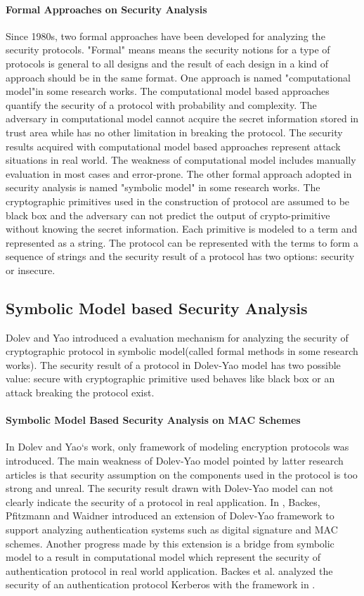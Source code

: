\documentclass{article}
\begin{document}
\paragraph{Formal Approaches on Security Analysis}
Since 1980s, two formal approaches have been developed for analyzing the security protocols. "Formal" means means the security notions for a type of protocols is general to all designs and the result of each design in a kind of approach should be in the same format. One approach is named "computational model"in some research works. The computational model based approaches quantify the security of a protocol with probability and complexity. The adversary in computational model cannot acquire the secret information stored in trust area while has no other limitation in breaking the protocol. The security results acquired with computational model based approaches represent attack situations in real world. The weakness of computational model includes manually evaluation in most cases and error-prone. 
The other formal approach adopted in security analysis is named "symbolic model" in some research works. The cryptographic primitives used in the construction of protocol are assumed to be black box and the adversary can not predict the output of crypto-primitive without knowing the secret information. Each primitive is modeled to a term and represented as a string. The protocol can be represented with the terms to form a sequence of strings and the security result of a protocol has two options: security or insecure.  
\subsection{Symbolic Model based Security Analysis}
Dolev and Yao introduced \cite{dolev-yao} a evaluation mechanism for analyzing the security of cryptographic protocol in
symbolic model(called formal methods in some research works). The security result of a protocol in
Dolev-Yao model has two possible value: secure with cryptographic primitive used
behaves like black box or an attack breaking the protocol exist.  
\paragraph{Symbolic Model Based Security Analysis on MAC Schemes}
In Dolev and Yao`s work, only framework of modeling encryption protocols was
introduced. The main weakness of Dolev-Yao model pointed by latter research
articles is that security assumption on the components used in the protocol is
too strong and unreal. The security result drawn with Dolev-Yao model can not
clearly indicate the security of a protocol in real application. In
\cite{symbolic-mac},
Backes, Pfitzmann and Waidner introduced an extension of Dolev-Yao framework to
support analyzing authentication systems such as digital signature and MAC
schemes. Another progress made by this extension is a bridge from symbolic model
to a result in computational model which represent the security of
authentication protocol in real world application.  Backes et al. analyzed the security of an authentication protocol
Kerberos with the framework in \cite{symbolic-kerberos}.
\end{document}
